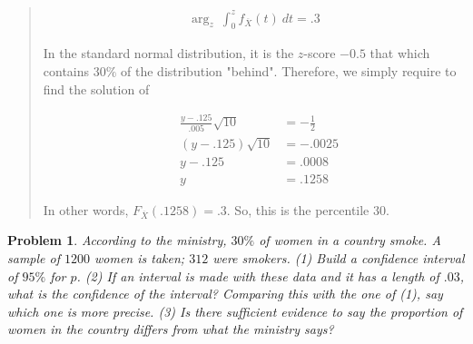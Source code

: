 \documentclass[a4paper, 12pt]{article}
\newtheorem{problem}{Problem}
\newtheorem{problem}{Problem}
\begin{document}
\begin{quote}
\begin{align*}
    \arg_z ~ \int_0^{z} f_{\overline{X}}(t) ~ dt = .3
\end{align*}

In the standard normal distribution, it is the $z$-score $-0.5$ that which
contains $30\%$ of the distribution "behind". Therefore, we simply require to
find the solution of 

\begin{align*}
    &\frac{y - .125}{.005}\sqrt{10}  &= -\frac{1}{2} \\ 
    &(y - .125)\sqrt{10}  &= -.0025 \\ 
    &y - .125 &= .0008 \\ 
    & y &= .1258
\end{align*}

In other words, $F_{\overline{X}}(.1258) = .3$. So, this is the percentile $30$.

\end{quote}
\normalsize

\pagebreak 

\begin{problem}
    According to the ministry, $30\%$ of women in a country smoke. A sample of $1200$ women is taken;
    $312$ were smokers. \textit{(1)} Build a confidence interval of $95\%$ for
    $p$. \textit{(2)} If an interval is made with these data and it has a length
    of $.03$, what is the confidence of the interval? Comparing this with the
    one of \textit{(1)}, say which one is more precise. \textit{(3)} Is there
    sufficient evidence to say the proportion of women in the country differs
    from what the ministry says?
\end{problem}
\end{document}
